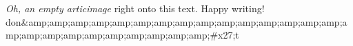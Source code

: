 \textit{Oh, an empty articimage} right onto this text. Happy writing! 
don&amp;amp;amp;amp;amp;amp;amp;amp;amp;amp;amp;amp;amp;amp;amp;amp;amp;amp;amp;amp;amp;amp;amp;amp;amp;#x27;t